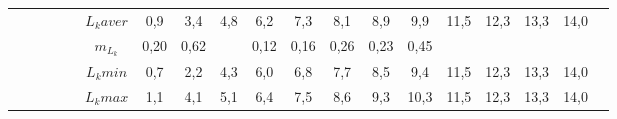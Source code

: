 \begin{landscape}
\begin{table}[h]
\begin{tabular}{|c|c|cc|cc|ccccccccccccc|}
        &   &       &       &         & $L_k aver$ & 0,9  & 3,4  & 4,8 & 6,2  & 7,3  & 8,1  & 8,9  & 9,9  & 11,5 & 12,3 & 13,3 & 14,0 &  \\
        &   &       &       &         & $m_{L_k}$  & 0,20 & 0,62 &     & 0,12 & 0,16 & 0,26 & 0,23 & 0,45 &      &      &      &      &  \\
        &   &       &       &         & $L_k min$  & 0,7  & 2,2  & 4,3 & 6,0  & 6,8  & 7,7  & 8,5  & 9,4  & 11,5 & 12,3 & 13,3 & 14,0 &  \\
        &   &       &       &         & $L_k max$  & 1,1  & 4,1  & 5,1 & 6,4  & 7,5  & 8,6  & 9,3  & 10,3 & 11,5 & 12,3 & 13,3 & 14,0 &  \\ \hline
\end{tabular}
\end{table}


\end{landscape}
